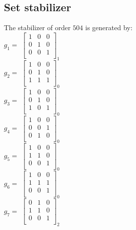 \documentclass{article}
\begin{document}
{\subsection*{Set stabilizer}
The stabilizer of order $504$ is generated by:\\
$g_{1} = $ $\left[
\begin{array}{*{3}{r}}
1 & 0 & 0\\
0 & 1 & 0\\
0 & 0 & 1\\
\end{array}
\right]
_{1}
$\\
$g_{2} = $ $\left[
\begin{array}{*{3}{r}}
1 & 0 & 0\\
0 & 1 & 0\\
1 & 1 & 1\\
\end{array}
\right]
_{0}
$\\
$g_{3} = $ $\left[
\begin{array}{*{3}{r}}
1 & 0 & 0\\
0 & 1 & 0\\
1 & 0 & 1\\
\end{array}
\right]
_{0}
$\\
$g_{4} = $ $\left[
\begin{array}{*{3}{r}}
1 & 0 & 0\\
0 & 0 & 1\\
0 & 1 & 0\\
\end{array}
\right]
_{0}
$\\
$g_{5} = $ $\left[
\begin{array}{*{3}{r}}
1 & 0 & 0\\
1 & 1 & 0\\
0 & 0 & 1\\
\end{array}
\right]
_{0}
$\\
$g_{6} = $ $\left[
\begin{array}{*{3}{r}}
1 & 0 & 0\\
1 & 1 & 1\\
0 & 0 & 1\\
\end{array}
\right]
_{0}
$\\
$g_{7} = $ $\left[
\begin{array}{*{3}{r}}
0 & 1 & 0\\
1 & 1 & 0\\
0 & 0 & 1\\
\end{array}
\right]
_{2}
$\\

}
\end{document}

